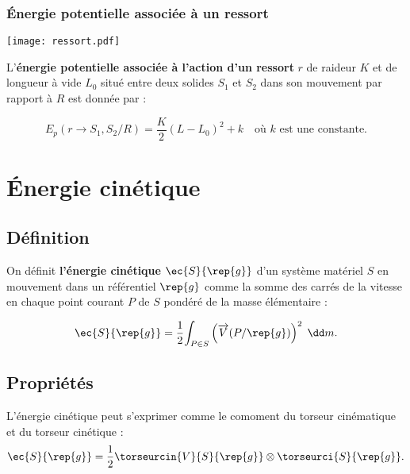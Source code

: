 \subsubsection{Énergie potentielle associée à un ressort}


\begin{marginfigure}
\texttt{[image: ressort.pdf]}
\end{marginfigure}

\begin{defi}

L'\textbf{énergie potentielle associée à l'action d'un ressort} $r$ de raideur $K$ et de longueur à vide $L_0$ situé entre deux solides $S_1$ et $S_2$ dans son mouvement par rapport à $R$ est donnée par :

$$
E_p(r \rightarrow S_1,S_2/R)=\frac{K}{2}(L-L_0)^2+k \quad \text{où }k\text{ est une constante}.
$$

\end{defi}



\section{Énergie cinétique}
\subsection{Définition}
\begin{defi}
On définit \textbf{l'énergie cinétique} $\ec{S}{\rep{g}}$ d'un système matériel $S$ en mouvement dans un référentiel $\rep{g}$ comme la somme des carrés de la vitesse en chaque point courant $P$ de $S$ pondéré de la masse élémentaire :

$$
\ec{S}{\rep{g}}=\frac{1}{2}\displaystyle{\int_{P\in S}} \left(\overrightarrow{V}(P/\rep{g})\right)^2\;\dd m.
$$

\end{defi}

\subsection{Propriétés}

\begin{prop}
L'énergie cinétique peut s'exprimer comme le comoment du torseur cinématique et du torseur cinétique :
$$\ec{S}{\rep{g}}=\frac{1}{2}\torseurcin{V}{S}{\rep{g}}\otimes \torseurci{S}{\rep{g}}.
$$
\end{prop}


